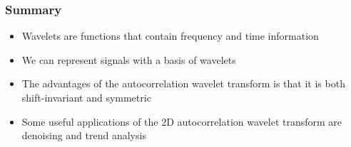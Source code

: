 \documentclass[aspectratio=169]{beamer}
\begin{document}
\begin{frame}
\frametitle{Summary}
\begin{itemize}
    \item Wavelets are functions that contain frequency and time information
    \item We can represent signals with a basis of wavelets
    \item The advantages of the autocorrelation wavelet transform is that it is both
    shift-invariant and symmetric
    \item Some useful applications of the 2D autocorrelation wavelet transform are denoising and trend analysis
\end{itemize}
\end{frame}
\end{document}
